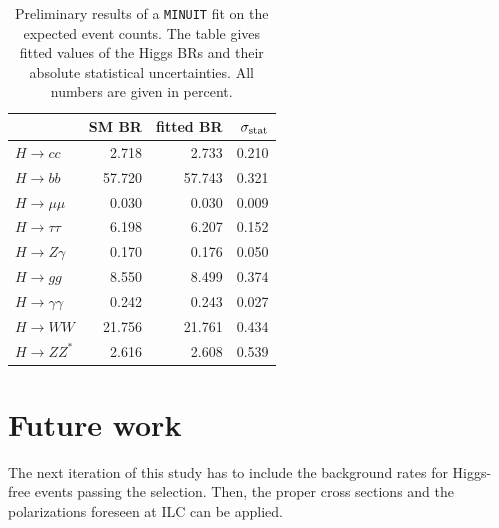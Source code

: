 \documentclass[11pt, hidelinks, a4paper]{scrartcl}
\newcommand{\tn}[1]{\textnormal{#1}}
\begin{document}
\begin{table}[ht]
    \centering
    \begin{tabular}{lrrr}
        \toprule
        {} &  SM BR &  fitted BR &  $\sigma_{\tn{stat}}$ \\
        \midrule
        $H\to cc$           &  2.718 &    2.733 &     0.210 \\
        $H\to bb$           & 57.720 &   57.743 &     0.321 \\
        $H\to \mu\mu$       &  0.030 &    0.030 &     0.009 \\
        $H\to \tau\tau$     &  6.198 &    6.207 &     0.152 \\
        $H\to Z\gamma$      &  0.170 &    0.176 &     0.050 \\
        $H\to gg$           &  8.550 &    8.499 &     0.374 \\
        $H\to \gamma\gamma$ &  0.242 &    0.243 &     0.027 \\
        $H\to WW$           & 21.756 &   21.761 &     0.434 \\
        $H\to ZZ^*$         &  2.616 &    2.608 &     0.539 \\
        \bottomrule
        \end{tabular}
    \caption{
        Preliminary results of a \texttt{MINUIT} fit on the expected event counts.
        The table gives fitted values of the Higgs BRs
        and their absolute statistical uncertainties.
        All numbers are given in percent. \\
        }\label{tab:br_uncertainties}
\end{table}

\section{Future work}\label{sec:future_work}
The next iteration of this study has to include the background rates for
Higgs-free events passing the selection.
Then, the proper cross sections and the polarizations foreseen at ILC
can be applied.
\end{document}
